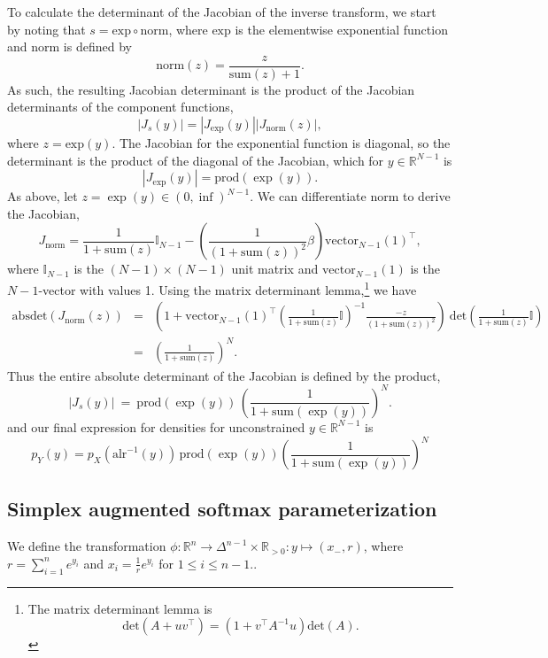\documentclass[11pt]{article}
\newcommand{\abs}[1]{\left| #1 \right|}
\newcommand{\absdet}[1]{\abs{#1}}
\begin{document}
To calculate the determinant of the Jacobian of the inverse transform,
we start by noting that $s = \textrm{exp} \circ \textrm{norm}$, where
$\textrm{exp}$ is the elementwise exponential function and
\textrm{norm} is defined by
\[
  \textrm{norm}(z) = \frac{z}{\textrm{sum}(z) + 1}.
\]
As such, the resulting Jacobian determinant is the product of the
Jacobian determinants of the component functions,
\[
  \absdet{J_s(y)}
  = \absdet{J_{\textrm{exp}}(y)} \absdet{J_{\textrm{norm}}(z)},
\]
where $z = \textrm{exp}(y)$.  The Jacobian for the exponential
function is diagonal, so the determinant is the product of the
diagonal of the Jacobian, which for $y \in \mathbb{R}^{N-1}$ is
\[
  \absdet{J_{\textrm{exp}}(y)} = \textrm{prod}(\exp(y)).
\]
As above, let $z = \exp(y) \in (0, \inf)^{N-1}$.  We can differentiate
$\textrm{norm}$ to derive the Jacobian,
\[
  J_{\textrm{norm}}
  = \frac{1}{1 + \textrm{sum}(z)} \mathbb{I}_{N-1}
  - \left(\frac{1}{(1 + \textrm{sum}(z))^2} \beta \right)
  \textrm{vector}_{N-1}(1)^{\top},
\]
where $\mathbb{I}_{N-1}$ is the $(N - 1) \times (N - 1)$ unit matrix and
$\textrm{vector}_{N-1}(1)$ is the $N - 1$-vector with values 1.  Using
the matrix determinant lemma,\footnote{The matrix determinant lemma
  is \[\textrm{det}(A + u v^{\top}) = (1 + v^{\top} A^{-1} u)
    \textrm{det}(A).\]}
we have
\begin{eqnarray*}
  \textrm{absdet}(J_{\textrm{norm}}(z))
  & = &
  \left(
    1
    + \textrm{vector}_{N-1}(1)^{\top}
    \left(\frac{1}{1 + \textrm{sum}(z)} \mathbb{I} \right)^{-1}
    \frac{-z}{(1 + \textrm{sum}(z))^2}
    \right)
    \ \textrm{det}\left(\frac{1}{1 + \textrm{sum}(z)} \mathbb{I}
        \right)
  \\[6pt]
  & = & \left( \frac{1}{1 + \textrm{sum}(z)} \right)^N.
\end{eqnarray*}
Thus the entire absolute determinant of the Jacobian is defined by the
product, 
\[
  \absdet{J_s(y)}
  \ = \
  \textrm{prod}(\exp(y))
  \, \left( \frac{1}{1 + \textrm{sum}(\exp(y))} \right)^N.
\]
and our final expression for densities for unconstrained $y \in
\mathbb{R}^{N-1}$ is
\[
  p_Y(y)
  = p_X(\textrm{alr}^{-1}(y))
  \, \textrm{prod}(\exp(y))
  \left( \frac{1}{1 + \textrm{sum}(\exp(y))} \right)^N
\]  



\subsection{Simplex augmented softmax parameterization}

We define the transformation
$\phi: \mathbb{R}^n \to \Delta^{n-1} \times \mathbb{R}_{>0}: y \mapsto
(x_-, r)$, where $r = \sum_{i=1}^n e^{y_i}$ and
$x_i = \frac{1}{r} e^{y_i}$ for $1 \le i \le n-1$..
\end{document}
